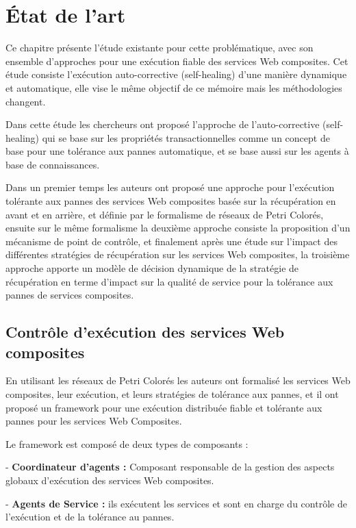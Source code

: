 
\vspace{1cm}

\chapter{État de l'art}

Ce chapitre présente l'étude existante pour cette problématique, avec son ensemble d'approches pour une exécution fiable des services Web composites.
Cet étude consiste l'exécution auto-corrective (self-healing) d'une manière dynamique et automatique, elle vise le même objectif de ce mémoire mais les méthodologies changent. 

Dans cette étude les chercheurs ont proposé l'approche de l'auto-corrective  (self-healing) qui se base sur les propriétés transactionnelles comme un concept de base pour une tolérance aux pannes automatique, et se base aussi sur les agents à base de connaissances.

Dans un premier temps les auteurs ont proposé une approche pour l'exécution tolérante aux pannes des services Web composites basée sur la récupération en avant et en arrière, et définie par le formalisme de réseaux de Petri Colorés, ensuite sur le même formalisme la deuxième approche consiste la proposition d'un mécanisme de point de contrôle, et finalement après une étude sur l'impact des différentes stratégies de récupération sur les services Web composites, la troisième approche apporte un modèle de décision dynamique de la stratégie de récupération en terme d'impact sur la qualité de service pour la tolérance aux pannes de services composites.


\section{Contrôle d'exécution des services Web composites}

En utilisant les réseaux de Petri Colorés les auteurs ont formalisé les services Web composites, leur exécution, et leurs stratégies de tolérance aux pannes, et il ont proposé un framework pour une exécution distribuée fiable et tolérante aux pannes pour les services Web Composites.

Le framework est composé de deux types de composants \cite{1} \cite{5}: 

- \textbf{Coordinateur d'agents :} Composant responsable de la gestion des aspects globaux d'exécution des services Web composites.

- \textbf{Agents de Service :} ils exécutent les services et sont en charge du contrôle de l'exécution et de la tolérance au pannes.

